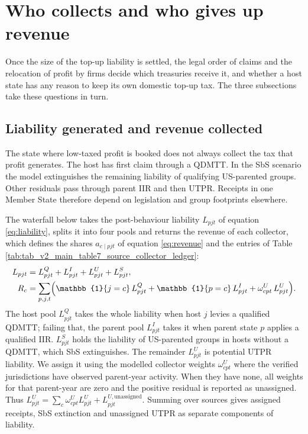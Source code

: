\documentclass[11pt,a4paper]{article}
\begin{document}
\section{Who collects and who gives up revenue}\label{sec:allocation}

Once the size of the top-up liability is settled, the legal order of claims and the relocation of profit by firms decide which treasuries receive it, and whether a host state has any reason to keep its own domestic top-up tax. The three subsections take these questions in turn.

\subsection{Liability generated and revenue collected}\label{sec:ledger}

The state where low-taxed profit is booked does not always collect the tax that profit generates. The host has first claim through a QDMTT. In the SbS scenario the model extinguishes the remaining liability of qualifying US-parented groups. Other residuals pass through parent IIR and then UTPR. Receipts in one Member State therefore depend on legislation and group footprints elsewhere.

The waterfall below takes the post-behaviour liability $L_{pjt}$ of equation \eqref{eq:liability}, splits it into four pools and returns the revenue of each collector, which defines the shares $a_{c\mid pjt}$ of equation \eqref{eq:revenue} and the entries of Table \ref{tab:tab_v2_main_table7_source_collector_ledger}:
\begin{align}
L_{pjt} &= L^{Q}_{pjt} + L^{I}_{pjt} + L^{U}_{pjt} + L^{S}_{pjt}, \label{eq:waterfall}\\
R_c &= \sum_{p,j,t}\Bigl(\mathbb{1}\{j=c\}\,L^{Q}_{pjt} + \mathbb{1}\{p=c\}\,L^{I}_{pjt} + \omega^{U}_{cpt}\,L^{U}_{pjt}\Bigr). \label{eq:collectors}
\end{align}
The host pool $L^{Q}_{pjt}$ takes the whole liability when host $j$ levies a qualified QDMTT; failing that, the parent pool $L^{I}_{pjt}$ takes it when parent state $p$ applies a qualified IIR. $L^{S}_{pjt}$ holds the liability of US-parented groups in hosts without a QDMTT, which SbS extinguishes. The remainder $L^{U}_{pjt}$ is potential UTPR liability. We assign it using the modelled collector weights $\omega^{U}_{cpt}$ where the verified jurisdictions have observed parent-year activity. When they have none, all weights for that parent-year are zero and the positive residual is reported as unassigned. Thus $L^{U}_{pjt} = \sum_c \omega^{U}_{cpt}L^{U}_{pjt} + L^{U,\mathrm{unassigned}}_{pjt}$. Summing over sources gives assigned receipts, SbS extinction and unassigned UTPR as separate components of liability.
\end{document}
